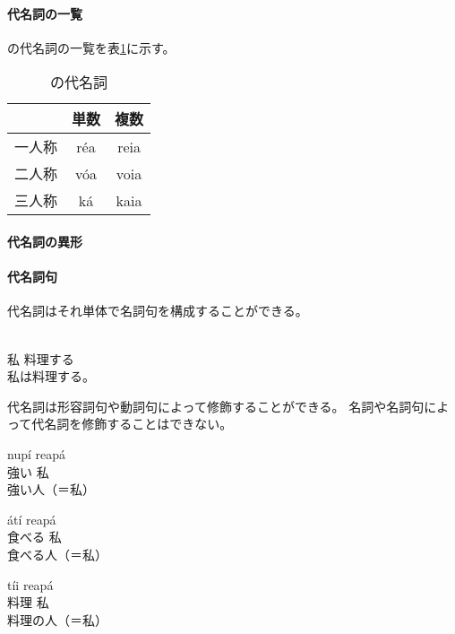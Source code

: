 \paragraph{代名詞の一覧}
\langname の代名詞の一覧を表\ref{tab:pronouns}に示す。

\begin{table}[H]
    \centering
    \begin{tabular}{lcc}
        \toprule
        & 単数 & 複数 \\
        \midrule
        一人称 & r\'ea & reia \\
        二人称 & v\'oa & voia \\
        三人称 & k\'a & kaia \\
  \bottomrule
    \end{tabular}
    \caption{\centering \langname の代名詞}
    \label{tab:pronouns}
\end{table}

\paragraph{代名詞の異形}

\paragraph{代名詞句}

代名詞はそれ単体で名詞句を構成することができる。

\begin{exe}
    \ex \gll [rea] [p\'a\'a t\'ii nep\'e\'a] \\
        私 料理する \\
    \glt 私は料理する。
\end{exe}

代名詞は形容詞句や動詞句によって修飾することができる。
名詞や名詞句によって代名詞を修飾することはできない。

\begin{exe}
    \ex \gll nup\'i reap\'a \\
        強い 私 \\
    \glt 強い人（＝私）
\end{exe}
\begin{exe}
    \ex \gll \'at\'i reap\'a \\
        食べる 私 \\
    \glt 食べる人（＝私）
\end{exe}
\begin{exe}
    \ex \gll *t\'ii reap\'a \\
        料理 私 \\
    \glt 料理の人（＝私）
\end{exe}
